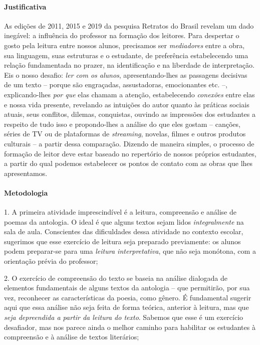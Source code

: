 \documentclass[11pt]{extarticle}
\begin{document}
\paragraph{Justificativa} As edições de 2011, 2015 e 2019 da pesquisa
Retratos do Brasil revelam um dado inegável: a influência do professor
na formação dos leitores. Para despertar o gosto pela leitura entre
nossos alunos, precisamos ser \emph{mediadores} entre a obra, sua
linguagem, suas estruturas e o estudante, de preferência estabelecendo
uma relação fundamentada no prazer, na identificação e na liberdade de
interpretação. Eis o nosso desafio: \emph{ler com os alunos},
apresentando-lhes as passagens decisivas de um texto -- porque são
engraçadas, assustadoras, emocionantes etc. --, explicando-lhes
\emph{por que} elas chamam a atenção, estabelecendo \emph{conexões}
entre elas e nossa vida presente, revelando as intuições do autor quanto
às práticas sociais atuais, seus conflitos, dilemas, conquistas, ouvindo
as impressões dos estudantes a respeito de tudo isso e propondo-lhes a
análise do que eles gostam -- canções, séries de TV ou de plataformas de
\emph{streaming}, novelas, filmes e outros produtos culturais -- a
partir dessa comparação. Dizendo de maneira simples, o processo de
formação de leitor deve estar baseado no repertório de nossos próprios
estudantes, a partir do qual podemos estabelecer os pontos de contato
com as obras que lhes apresentamos.

\paragraph{Metodologia}

1. A primeira atividade imprescindível é a leitura, compreensão e
análise de poemas da antologia. O ideal é que alguns textos sejam lidos
\emph{integralmente} na sala de aula. Conscientes das dificuldades dessa
atividade no contexto escolar, sugerimos que esse exercício de leitura
seja preparado previamente: os alunos podem preparar-se para uma
\emph{leitura interpretativa}, que não seja monótona, com a orientação
prévia do professor;

\vspace{3mm}

2. O exercício de compreensão do texto se baseia na análise dialogada de
elementos fundamentais de alguns textos da antologia -- que permitirão,
por sua vez, reconhecer as características da poesia, como gênero. É
fundamental sugerir aqui que essa análise não seja feita de forma
teórica, anterior à leitura, mas que \emph{seja depreendida a partir da
leitura do texto}. Sabemos que esse é um exercício desafiador, mas nos
parece ainda o melhor caminho para habilitar os estudantes à compreensão
e à análise de textos literários;
\end{document}
